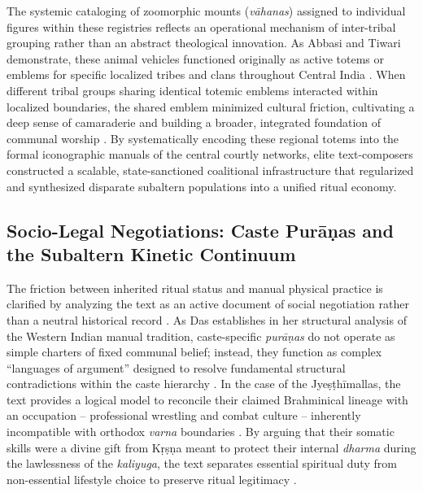 \documentclass[11pt,twoside,letterpaper]{article}
\begin{document}
The systemic cataloging of zoomorphic mounts (\textit{v\={a}hanas}) assigned to individual figures within these registries reflects an operational mechanism of inter-tribal grouping rather than an abstract theological innovation. As Abbasi and Tiwari demonstrate, these animal vehicles functioned originally as active totems or emblems for specific localized tribes and clans throughout Central India \citep{Abbasi2001}. When different tribal groups sharing identical totemic emblems interacted within localized boundaries, the shared emblem minimized cultural friction, cultivating a deep sense of camaraderie and building a broader, integrated foundation of communal worship \citep{Abbasi2001}. By systematically encoding these regional totems into the formal iconographic manuals of the central courtly networks, elite text-composers constructed a scalable, state-sanctioned coalitional infrastructure that regularized and synthesized disparate subaltern populations into a unified ritual economy.

\subsection{Socio-Legal Negotiations: Caste Pur\={a}\d{n}as and the Subaltern Kinetic Continuum}
The friction between inherited ritual status and manual physical practice is clarified by analyzing the text as an active document of social negotiation rather than a neutral historical record \citep{Das1968}. As Das establishes in her structural analysis of the Western Indian manual tradition, caste-specific \textit{pur\={a}\d{n}as} do not operate as simple charters of fixed communal belief; instead, they function as complex ``languages of argument'' designed to resolve fundamental structural contradictions within the caste hierarchy \citep{Das1968}. In the case of the Jye\d{s}\d{t}h\={i}mallas, the text provides a logical model to reconcile their claimed Brahminical lineage with an occupation -- professional wrestling and combat culture -- inherently incompatible with orthodox \textit{varna} boundaries \citep{Das1968}. By arguing that their somatic skills were a divine gift from K\d{r}\d{s}\d{n}a meant to protect their internal \textit{dharma} during the lawlessness of the \textit{kaliyuga}, the text separates essential spiritual duty from non-essential lifestyle choice to preserve ritual legitimacy \citep{Das1968}.
\end{document}
